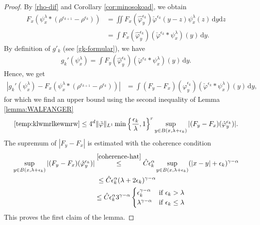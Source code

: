 \begin{itemize}
    \begin{proof}
        By \eqref{rho-dif} and Corollary \ref{cor:minosokoad}, we obtain 
        \begin{align*}
            F_x(\psi^\lambda_x * (\rho^{\epsilon_{k+1}} - \rho^{\epsilon_k})) &= \iint F_x(\hat \varphi^{\epsilon_k}_y) \check \varphi^{\epsilon_k}(y-z) \psi^{\lambda}_x(z) \, \mathrm{d}y \mathrm{d}z\\
             &= \int F_x(\hat \varphi^{\epsilon_k}_y) ( \check\varphi^{\epsilon_k} * \psi^{\lambda}_x)(y) \, \mathrm{d}y.
        \end{align*}
        By definition of $g'_k$ (see \eqref{gk-formular}), we have 
        \begin{align*}
            g_k'(\psi^\lambda_x) = \int F_y(\hat \varphi^{\epsilon_k}_y) (\check \varphi^{\epsilon_k}* \psi^\lambda_x)(y) \, \mathrm{d}y.
        \end{align*}
        Hence, we get
        \begin{align}\label{temp:klwmrlkewmrw}
            |g_k'(\psi^\lambda_x) - F_x(\psi^\lambda_x * (\rho^{\epsilon_{k+1}} - \rho^{\epsilon_k}))| 
            &= \int (F_y-F_x)(\hat \varphi^{\epsilon_k}_y) (\check \varphi^{\epsilon_k}* \psi^\lambda_x)(y) \, \mathrm{d}y,
        \end{align}
        for which we find an upper bound using the second inequality of Lemma \ref{lemma:WALFANGER}
        \begin{align*}
            \eqref{temp:klwmrlkewmrw} \leq 4^d \lVert \check \varphi \rVert_{L^1} \min \left\{ \frac{\epsilon_k}{\lambda}, 1 \right\}^r \sup_{y \in B(x, \lambda + \epsilon_k)} |(F_y - F_x)(\hat \varphi_y^{\epsilon_k})|.
        \end{align*}
        The supremum of $|F_y-F_x|$ is estimated with the coherence condition
        \begin{align*}
            \sup_{y \in B(x, \lambda + \epsilon_k)} |(F_y - F_x)(\hat \varphi^{\epsilon_k}_y)| &\overset{\eqref{coherence-hat}}{\leq} \hat C \epsilon_k^{\alpha} \sup_{y \in B(x, \lambda + \epsilon_k)} (|x - y| + \epsilon_k )^{\gamma - \alpha} \\
            &\;\leq \hat C \epsilon^\alpha_k(\lambda + 2\epsilon_k)^{\gamma - \alpha} \\
            &\leq \hat C \epsilon^\alpha_k 3^{\gamma - \alpha} \begin{cases}
                \epsilon_k^{\gamma - \alpha} &\text{if $\epsilon_k > \lambda$ } \\
                \lambda^{\gamma - \alpha} &\text{if $\epsilon_k \leq \lambda$ }
            \end{cases}
        \end{align*}
        This proves the first claim of the lemma.


\end{proof}
\end{itemize}
